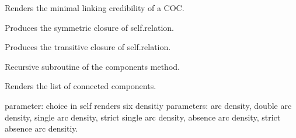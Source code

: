 \documentclass[letterpaper,10pt,english]{sphinxmanual}
\begin{document}
\begin{fulllineitems}
\begin{fulllineitems}
\label{techDoc:digraphs.Digraph.circuitMinCredibility}
Renders the minimal linking credibility of a COC.

\end{fulllineitems}


\begin{fulllineitems}
\label{techDoc:digraphs.Digraph.closeSymmetric}
Produces the symmetric closure of self.relation.

\end{fulllineitems}


\begin{fulllineitems}
\label{techDoc:digraphs.Digraph.closeTransitive}
Produces the transitive closure of self.relation.

\end{fulllineitems}


\begin{fulllineitems}
\label{techDoc:digraphs.Digraph.collectcomps}
Recursive subroutine of the components method.

\end{fulllineitems}


\begin{fulllineitems}
\label{techDoc:digraphs.Digraph.components}
Renders the list of connected components.

\end{fulllineitems}


\begin{fulllineitems}
\label{techDoc:digraphs.Digraph.computeAllDensities}
parameter: choice in self
renders six densitiy parameters:
arc density, double arc density,
single arc density, strict single arc density,
absence arc density, strict absence arc densitiy.


\end{fulllineitems}
\end{fulllineitems}
\end{document}
